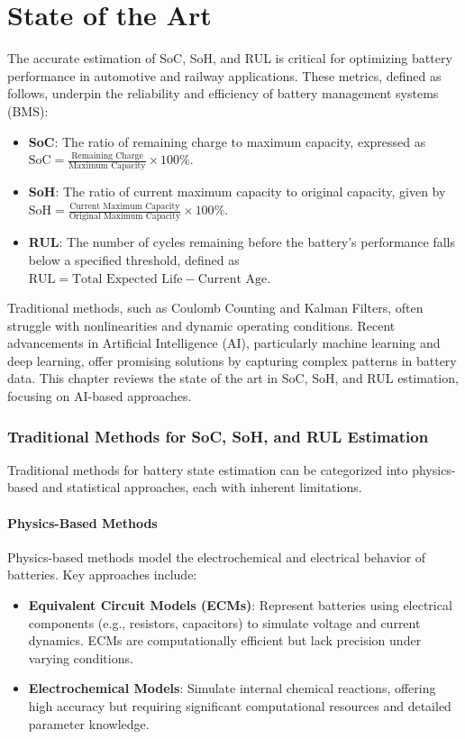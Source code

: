 \chapter{State of the Art}
\label{ch:stateoftheart}
The accurate estimation of SoC, SoH, and RUL is critical for optimizing battery performance in automotive and railway applications. These metrics, defined as follows, underpin the reliability and efficiency of battery management systems (BMS):
\begin{itemize}
    \item \textbf{SoC}: The ratio of remaining charge to maximum capacity, expressed as \( \text{SoC} = \frac{\text{Remaining Charge}}{\text{Maximum Capacity}} \times 100\% \).
    \item \textbf{SoH}: The ratio of current maximum capacity to original capacity, given by \( \text{SoH} = \frac{\text{Current Maximum Capacity}}{\text{Original Maximum Capacity}} \times 100\% \).
    \item \textbf{RUL}: The number of cycles remaining before the battery's performance falls below a specified threshold, defined as \( \text{RUL} = \text{Total Expected Life} - \text{Current Age} \).
\end{itemize}
Traditional methods, such as Coulomb Counting and Kalman Filters, often struggle with nonlinearities and dynamic operating conditions. Recent advancements in Artificial Intelligence (AI), particularly machine learning and deep learning, offer promising solutions by capturing complex patterns in battery data. This chapter reviews the state of the art in SoC, SoH, and RUL estimation, focusing on AI-based approaches.

\subsection{Traditional Methods for SoC, SoH, and RUL Estimation}
Traditional methods for battery state estimation can be categorized into physics-based and statistical approaches, each with inherent limitations.

\subsubsection{Physics-Based Methods}
Physics-based methods model the electrochemical and electrical behavior of batteries. Key approaches include:
\begin{itemize}
    \item \textbf{Equivalent Circuit Models (ECMs)}: Represent batteries using electrical components (e.g., resistors, capacitors) to simulate voltage and current dynamics. ECMs are computationally efficient but lack precision under varying conditions.
    \item \textbf{Electrochemical Models}: Simulate internal chemical reactions, offering high accuracy but requiring significant computational resources and detailed parameter knowledge.
\end{itemize}


